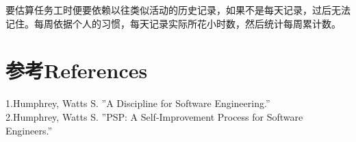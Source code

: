 要估算任务工时便要依赖以往类似活动的历史记录，如果不是每天记录，过后无法记住。每周依据个人的习惯，每天记录实际所花小时数，然后统计每周累计数。\\

\hypertarget{ux53c2ux8003references}{%
\section{参考References}\label{ux53c2ux8003references}}

1.Humphrey, Watts S. ''A Discipline for Software Engineering.''\\
2.Humphrey, Watts S. ''PSP: A Self-Improvement Process for Software Engineers.'' \\

